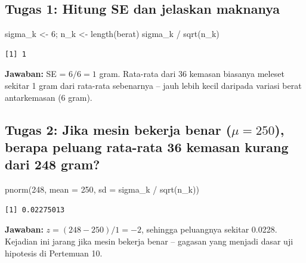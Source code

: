 \documentclass[
  indonesian,
  letterpaper,
]{book}
\newenvironment{Shaded}{\begin{snugshade}}{\end{snugshade}}
\newcommand{\AttributeTok}[1]{\textcolor[rgb]{0.40,0.45,0.13}{#1}}
\newcommand{\DecValTok}[1]{\textcolor[rgb]{0.68,0.00,0.00}{#1}}
\newcommand{\FunctionTok}[1]{\textcolor[rgb]{0.28,0.35,0.67}{#1}}
\newcommand{\NormalTok}[1]{\textcolor[rgb]{0.00,0.23,0.31}{#1}}
\newcommand{\OtherTok}[1]{\textcolor[rgb]{0.00,0.23,0.31}{#1}}
\newcommand{\SpecialCharTok}[1]{\textcolor[rgb]{0.37,0.37,0.37}{#1}}
\begin{document}
\subsection{Tugas 1: Hitung SE dan jelaskan
maknanya}\label{tugas-1-hitung-se-dan-jelaskan-maknanya}

\begin{Shaded}
\begin{Highlighting}[]
\NormalTok{sigma\_k }\OtherTok{\textless{}{-}} \DecValTok{6}\NormalTok{; n\_k }\OtherTok{\textless{}{-}} \FunctionTok{length}\NormalTok{(berat)}
\NormalTok{sigma\_k }\SpecialCharTok{/} \FunctionTok{sqrt}\NormalTok{(n\_k)}
\end{Highlighting}
\end{Shaded}

\begin{verbatim}
[1] 1
\end{verbatim}

\textbf{Jawaban:} SE = \(6/6 = 1\) gram. Rata-rata dari 36 kemasan
biasanya meleset sekitar 1 gram dari rata-rata sebenarnya -- jauh lebih
kecil daripada variasi berat antarkemasan (6 gram).

\subsection{\texorpdfstring{Tugas 2: Jika mesin bekerja benar
(\(\mu = 250\)), berapa peluang rata-rata 36 kemasan kurang dari 248
gram?}{Tugas 2: Jika mesin bekerja benar (\textbackslash mu = 250), berapa peluang rata-rata 36 kemasan kurang dari 248 gram?}}\label{tugas-2-jika-mesin-bekerja-benar-mu-250-berapa-peluang-rata-rata-36-kemasan-kurang-dari-248-gram}

\begin{Shaded}
\begin{Highlighting}[]
\FunctionTok{pnorm}\NormalTok{(}\DecValTok{248}\NormalTok{, }\AttributeTok{mean =} \DecValTok{250}\NormalTok{, }\AttributeTok{sd =}\NormalTok{ sigma\_k }\SpecialCharTok{/} \FunctionTok{sqrt}\NormalTok{(n\_k))}
\end{Highlighting}
\end{Shaded}

\begin{verbatim}
[1] 0.02275013
\end{verbatim}

\textbf{Jawaban:} \(z = (248 - 250)/1 = -2\), sehingga peluangnya
sekitar 0.0228. Kejadian ini jarang jika mesin bekerja benar -- gagasan
yang menjadi dasar uji hipotesis di Pertemuan 10.
\end{document}
